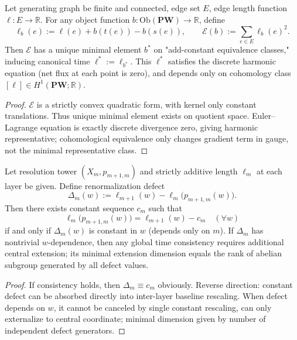 \begin{theorem}\label{thm:xi-canonical-time-gauge-harmonic-representative}
Let generating graph be finite and connected, edge set \(E\), edge length function \(\ell:E\to\mathbb R\).
For any object function \(b:\mathrm{Ob}(\mathbf{PW})\to\mathbb R\), define
\[
\ell_b(e):=\ell(e)+b(t(e))-b(s(e)),
\qquad
\mathcal E(b):=\sum_{e\in E}\ell_b(e)^2.
\]
Then \(\mathcal E\) has a unique minimal element \(b^\ast\) on "add-constant equivalence classes," inducing canonical time
\(
\ell^\ast:=\ell_{b^\ast}
\).
This \(\ell^\ast\) satisfies the discrete harmonic equation (net flux at each point is zero), and depends only on cohomology class \([\ell]\in H^1(\mathbf{PW};\mathbb R)\).
\end{theorem}

\begin{proof}
\(\mathcal E\) is a strictly convex quadratic form, with kernel only constant translations.
Thus unique minimal element exists on quotient space.
Euler--Lagrange equation is exactly discrete divergence zero, giving harmonic representative; cohomological equivalence only changes gradient term in gauge, not the minimal representative class.
\end{proof}

\begin{theorem}\label{thm:xi-cross-resolution-time-renormalization-defect}
Let resolution tower \((X_m,p_{m+1,m})\) and strictly additive length \(\ell_m\) at each layer be given.
Define renormalization defect
\[
\Delta_m(w):=\ell_{m+1}(w)-\ell_m\!\bigl(p_{m+1,m}(w)\bigr).
\]
Then there exists constant sequence \(c_m\) such that
\[
\ell_m\!\bigl(p_{m+1,m}(w)\bigr)=\ell_{m+1}(w)-c_m\quad(\forall w)
\]
if and only if \(\Delta_m(w)\) is constant in \(w\) (depends only on \(m\)).
If \(\Delta_m\) has nontrivial \(w\)-dependence, then any global time consistency requires additional central extension; its minimal extension dimension equals the rank of abelian subgroup generated by all defect values.
\end{theorem}

\begin{proof}
If consistency holds, then \(\Delta_m\equiv c_m\) obviously.
Reverse direction: constant defect can be absorbed directly into inter-layer baseline rescaling.
When defect depends on \(w\), it cannot be canceled by single constant rescaling, can only externalize to central coordinate; minimal dimension given by number of independent defect generators.
\end{proof}

